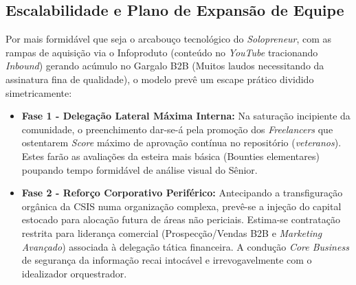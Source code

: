 \documentclass[../main.tex]{subfiles}
\begin{document}
\subsection{Escalabilidade e Plano de Expansão de Equipe}
Por mais formidável que seja o arcabouço tecnológico do \textit{Solopreneur}, com as rampas de aquisição via o Infoproduto (conteúdo no \textit{YouTube} tracionando \textit{Inbound}) gerando acúmulo no Gargalo B2B (Muitos laudos necessitando da assinatura fina de qualidade), o modelo prevê um escape prático dividido simetricamente:
\begin{itemize}
    \item \textbf{Fase 1 - Delegação Lateral Máxima Interna:} Na saturação incipiente da comunidade, o preenchimento dar-se-á pela promoção dos \textit{Freelancers} que ostentarem \textit{Score} máximo de aprovação contínua no repositório (\textit{veteranos}). Estes farão as avaliações da esteira mais básica (Bounties elementares) poupando tempo formidável de análise visual do Sênior.
    \item \textbf{Fase 2 - Reforço Corporativo Periférico:} Antecipando a transfiguração orgânica da CSIS numa organização complexa, prevê-se a injeção do capital estocado para alocação futura de áreas não periciais. Estima-se contratação restrita para liderança comercial (Prospecção/Vendas B2B e \textit{Marketing Avançado}) associada à delegação tática financeira. A condução \textit{Core Business} de segurança da informação recai intocável e irrevogavelmente com o idealizador orquestrador.
\end{itemize}
\end{document}
